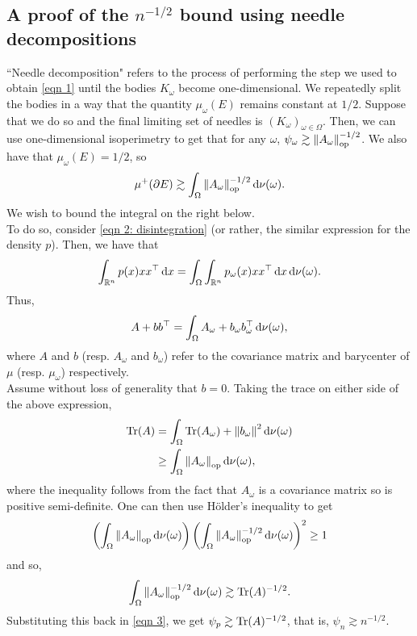 \documentclass{article}
\begin{document}
	\subsection{A proof of the \texorpdfstring{$n^{-1/2}$}{n-12} bound using needle decompositions}

		``Needle decomposition" refers to the process of performing the step we used to obtain \eqref{eqn 1} until the bodies $K_\omega$ become one-dimensional. We repeatedly split the bodies in a way that the quantity $\mu_\omega(E)$ remains constant at $1/2$. Suppose that we do so and the final limiting set of needles is $(K_\omega)_{\omega\in\Omega}$. Then, we can use one-dimensional isoperimetry to get that for any $\omega$, $\psi_\omega \gtrsim \left\lVert A_\omega\right\rVert_{\text{op}}^{-1/2}$. We also have that $\mu_\omega(E) = 1/2$, so
		\begin{equation}
			\label{eqn 3}
			\mu^+(\partial E) \gtrsim \int_\Omega \left\lVert A_\omega\right\rVert_{\text{op}}^{-1/2} \operatorname{d}\!{\nu}(\omega).
		\end{equation}
		We wish to bound the integral on the right below.\\

		To do so, consider \eqref{eqn 2: disintegration} (or rather, the similar expression for the density $p$). Then, we have that
		\[ \int_{\Rn} p(x) xx^\top \dif x = \int_\Omega \int_{\Rn} p_\omega(x) xx^\top \dif x \dif {\nu(\omega)}. \]
		Thus,
		\begin{equation}
			\label{eqn 5}
			A + bb^\top = \int_\Omega A_\omega + b_\omega b_\omega^\top \operatorname{d}\!{\nu(\omega)},
		\end{equation}
		where $A$ and $b$ (resp. $A_\omega$ and $b_\omega$) refer to the covariance matrix and barycenter of $\mu$ (resp. $\mu_\omega$) respectively.\\
		Assume without loss of generality that $b = 0$. Taking the trace on either side of the above expression,
		\begin{align*}
			\operatorname{Tr}(A) &= \int_\Omega \operatorname{Tr}(A_\omega) + \left\lVert b_\omega\right\rVert^2 \operatorname{d}\!{\nu(\omega)} \\
				&\geq \int_\Omega \left\lVert A_\omega\right\rVert_{\text{op}} \operatorname{d}\!{\nu(\omega)},
		\end{align*}
		where the inequality follows from the fact that $A_\omega$ is a covariance matrix so is positive semi-definite.
		One can then use H\"older's inequality to get
		\[ \left(\int_\Omega \left\lVert A_\omega\right\rVert_{\text{op}} \operatorname{d}\!{\nu(\omega)} \right) \left( \int_\Omega \left\lVert A_\omega\right\rVert_{\text{op}}^{-1/2} \operatorname{d}\!{\nu(\omega)} \right)^2 \geq 1 \]
		and so,
		\[ \int_\Omega \left\lVert A_\omega\right\rVert_{\text{op}}^{-1/2} \operatorname{d}\!{\nu(\omega)} \gtrsim \operatorname{Tr}(A)^{-1/2}.  \]
		Substituting this back in \eqref{eqn 3}, we get $\psi_p \gtrsim \operatorname{Tr}(A)^{-1/2}$, that is, $\psi_n \gtrsim n^{-1/2}$.
\end{document}
